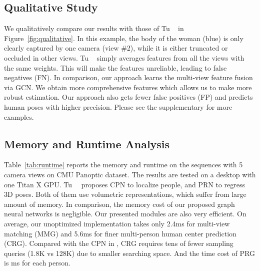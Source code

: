 \documentclass[10pt,twocolumn,letterpaper]{article}
\begin{document}
\subsection{Qualitative Study}

We qualitatively compare our results with those of Tu \etal~\cite{tu2020voxelpose} in Figure~\ref{fig:qualitative}. In this example, the body of the woman (blue) is only clearly captured by one camera (view \#2), while it is either truncated or occluded in other views. Tu \etal~\cite{tu2020voxelpose} simply averages features from all the views with the same weights. This will make the features unreliable, leading to false negatives (FN). In comparison, our approach learns the multi-view feature fusion via GCN. We obtain more comprehensive features which allows us to make more robust estimation. Our approach also gets fewer false positives (FP) and predicts human poses with higher precision. Please see the supplementary for more examples. 

\subsection{Memory and Runtime Analysis}

\begin{table}[h]
    \centering
    \caption{Memory and runtime analysis on CMU Panoptic dataset. Runtime is tested with one Titan X GPU.  denotes the cost of processing one person proposal.}
    \label{tab:runtime}
\end{table}

Table~\ref{tab:runtime} reports the memory and runtime on the sequences with 5 camera views on CMU Panoptic dataset. The results are tested on a desktop with one Titan X GPU. Tu~\etal~\cite{tu2020voxelpose} proposes CPN to localize people, and PRN to regress 3D poses. Both of them use volumetric representations, which suffer from large amount of memory. In comparison, the memory cost of our proposed graph neural networks is negligible. Our presented modules are also very efficient. On average, our unoptimized implementation takes only 2.4ms for multi-view matching (MMG) and 5.6ms for finer multi-person human center prediction (CRG). Compared with the CPN in \cite{tu2020voxelpose}, CRG requires tens of fewer sampling queries (1.8K vs 128K) due to smaller searching space. And the time cost of PRG is ms for each person.
\end{document}
